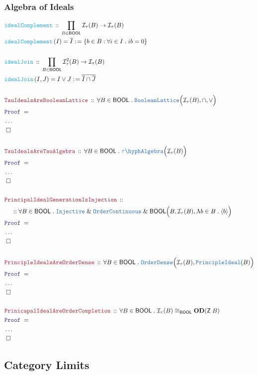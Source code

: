 \documentclass[12pt]{scrartcl}
\newcommand{\TYPE}[1]{\textcolor{NavyBlue}{\mathtt{#1}}}
\newcommand{\FUNC}[1]{\textcolor{Cerulean}{\mathtt{#1}}}
\newcommand{\LOGIC}[1]{\textcolor{Blue}{\mathtt{#1}}}
\newcommand{\THM}[1]{\textcolor{Maroon}{\mathtt{#1}}}
\renewcommand{\.}{\; . \;}
\newcommand{\de}{: \kern 0.1pc =}
\newcommand{\Act}[1]{\left( #1 \right)}
\newcommand{\Theorem}[2]{& \THM{#1} \, :: \, #2 \\ & \Proof = \\ }
\newcommand{\DeclareFunc}[2]{& \FUNC{#1} \, :: \, #2 \\}
\newcommand{\DefineNamedFunc}[4]{&  \FUNC{#1}\Act{#2} = #3 \de #4 \\}
\newcommand{\NewLine}{\\ & \kern 1pc}
\newcommand{\Page}[1]{ \begin{align*} #1 \end{align*}   }
\newcommand{\NoProof}{ & \ldots \\ \EndProof}
\renewcommand{\And}{\; \& \;}
\newcommand{\Inj}{\TYPE{Injective}}
\newcommand{\QED}{\; \square}
\newcommand{\EndProof}{& \QED \\}
\newcommand{\Proof}{\LOGIC{Proof} \; }
\newcommand{\I}{\mathcal{I}}
\newcommand{\Principle}{\TYPE{PrincipleIdeal}}
\newcommand{\BL}{\TYPE{BooleanLattice}}
\newcommand{\oC}{\TYPE{OrderContinuous}}
\newcommand{\OD}{\TYPE{OrderDense}}
\newcommand{\TAlgebra}{\TYPE{\tau\hyph Algebra}}
\newcommand{\od}{\mathbf{OD}}
\newcommand{\BOOL}{\mathsf{BOOL}}
\newcommand{\Z}{\mathsf{Z}}
\begin{document}
\subsubsection{Algebra of Ideals}
\Page{
	\DeclareFunc{idealComplement}{\prod_{B \in \BOOL} \I_\tau(B) \to \I_\tau(B)}
	\DefineNamedFunc{idealComplement}{I}{\overline{I}}
	{\{ b \in B : \forall i \in I \. ib = 0 \}}
	\\
	\DeclareFunc{idealJoin}{\prod_{B \in \BOOL}\I_\tau^2(B) \to \I_\tau(B)}
	\DefineNamedFunc{idealJoin}{I,J}{I \vee J}{ \overline{\overline{I}\cap\overline{J}}}
	\\
	\Theorem{TauIdealsAreBooleanLattice}
	{
		\forall B \in \BOOL \. 
		\BL\Big( \I_\tau(B),\cap,\vee \Big)
	}
	\NoProof
	\\
	\Theorem{TauIdealsAreTauAlgebra}
	{
		\forall B \in \BOOL \. 
		\TAlgebra\Big( \I_\tau(B) \Big)
	}
	\NoProof
	\\
	\Theorem{PrincipalIdealGenerationIsInjection}
	{
		\NewLine ::		
		\forall B \in \BOOL \. 
		\Inj \And \oC \And \BOOL\Big( B, \I_\tau(B)  , \Lambda b \in B \. \langle b \rangle \Big)
	}
	\NoProof
	\\
	\Theorem{PrincipleIdealsAreOrderDense}
	{
		\forall B \in \BOOL \.
		\OD\Big(\I_\tau(B), \Principle(B) \Big)
	}
	\NoProof
	\\
	\Theorem{PrinicapalIdealAreOrderCompletion}
	{
		\forall B \in \BOOL \.
		\I_\tau(B) \cong_\BOOL \od(\Z\;B)
	}
	\NoProof
}
\newpage
\subsection{Category Limits}
\end{document}
